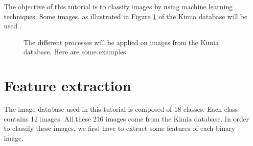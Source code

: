 \def\difficulty{2}

\vspace*{10pt}
\begin{note}The objective of this tutorial is to classify images by using machine learning techniques. Some images, as illustrated in Figure \ref{fig:machine_learning:enonce:examples} of the Kimia database will be used \cite{KimiaDB,Sharvit1998}.\end{note}

\begin{figure}[H]
\centering\caption{The different processes will be applied on images from the Kimia database. Here are some examples.}%
\hfill
{}
\hfill
{}
\hfill
{}%
\label{fig:machine_learning:enonce:examples}\vspace*{-10pt}%
\end{figure}


\section{Feature extraction}
The image database used in this tutorial is composed of 18 classes. Each class contains 12 images. All these 216 images come from the Kimia database. In order to classify these images, we first have to extract some features of each binary image. 


